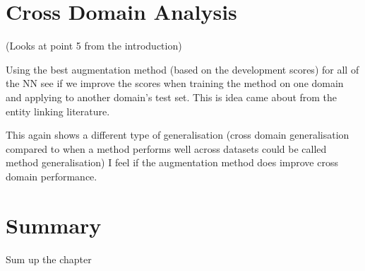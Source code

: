 \section{Cross Domain Analysis}
(Looks at point 5 from the introduction)

Using the best augmentation method (based on the development scores) for all of the NN see if we improve the scores when training the method on one domain and applying to another domain's test set. This is idea came about from the entity linking literature.

This again shows a different type of generalisation (cross domain generalisation compared to when a method performs well across datasets could be called method generalisation) I feel if the augmentation method does improve cross domain performance.

\section{Summary}
Sum up the chapter
